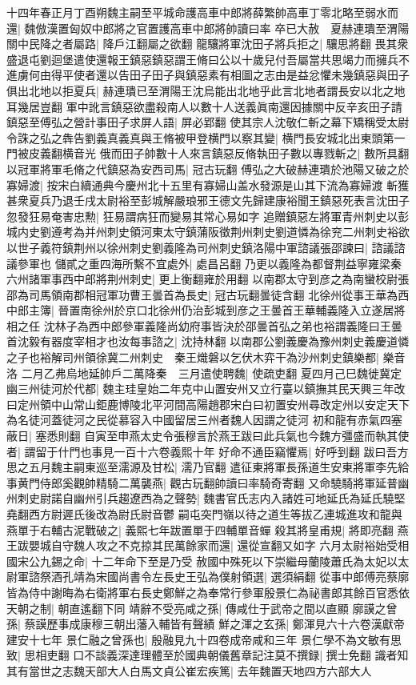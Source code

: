 十四年春正月丁酉朔魏主嗣至平城命護高車中郎將薛繁帥高車丁零北略至弱水而還|{
	魏倣漢置匈奴中郎將之官置護高車中郎將帥讀曰率}
卒已大赦　夏赫連璝至渭陽關中民降之者屬路|{
	降戶江翻屬之欲翻}
龍驤將軍沈田子將兵拒之|{
	驤思將翻}
畏其衆盛退屯劉迴堡遣使還報王鎮惡鎮惡謂王脩曰公以十歲兒付吾屬當共思竭力而擁兵不進虜何由得平使者還以告田子田子與鎮惡素有相圖之志由是益忿懼未幾鎮惡與田子俱出北地以拒夏兵|{
	赫連璝已至渭陽王沈烏能出北地乎此言北地者謂長安以北之地耳幾居豈翻}
軍中訛言鎮惡欲盡殺南人以數十人送義眞南還因據關中反辛亥田子請鎮惡至傅弘之營計事田子求屏人語|{
	屏必郢翻}
使其宗人沈敬仁斬之幕下矯稱受太尉令誅之弘之犇告劉義真義真與王脩被甲登横門以察其變|{
	横門長安城北出東頭第一門被皮義翻横音光}
俄而田子帥數十人來言鎮惡反脩執田子數以專戮斬之|{
	數所具翻}
以冠軍將軍毛脩之代鎮惡為安西司馬|{
	冠古玩翻}
傅弘之大破赫連璝於池陽又破之於寡婦渡|{
	按宋白續通典今慶州北十五里有寡婦山盖水發源是山其下流為寡婦渡}
斬獲甚衆夏兵乃退壬戌太尉裕至彭城解嚴琅邪王德文先歸建康裕聞王鎮惡死表言沈田子忽發狂易奄害忠勲|{
	狂易謂病狂而變易其常心易如字}
追贈鎮惡左將軍青州刺史以彭城内史劉遵考為并州刺史領河東太守鎮蒲阪徵荆州刺史劉道憐為徐兖二州刺史裕欲以世子義符鎮荆州以徐州刺史劉義隆為司州刺史鎮洛陽中軍諮議張邵諫曰|{
	諮議諮議參軍也}
儲貳之重四海所繫不宜處外|{
	處昌呂翻}
乃更以義隆為都督荆益寧雍梁秦六州諸軍事西中郎將荆州刺史|{
	更上衡翻雍於用翻}
以南郡太守到彦之為南蠻校尉張邵為司馬領南郡相冠軍功曹王曇首為長史|{
	冠古玩翻曇徒含翻}
北徐州從事王華為西中郎主簿|{
	晉置南徐州於京口北徐州仍治彭城到彦之王曇首王華輔義隆入立遂居將相之任}
沈林子為西中郎參軍義隆尚幼府事皆決於邵曇首弘之弟也裕謂義隆曰王曇首沈毅有器度宰相才也汝每事諮之|{
	沈持林翻}
以南郡公劉義慶為豫州刺史義慶道憐之子也裕解司州領徐冀二州刺史　秦王熾磐以乞伏木弈干為沙州刺史鎮樂都|{
	樂音洛}
二月乙弗烏地延帥戶二萬降秦　三月遣使聘魏|{
	使疏吏翻}
夏四月己巳魏徙冀定幽三州徒河於代都|{
	魏主珪皇始二年克中山置安州又立行臺以鎮撫其民天興三年改曰定州領中山常山鉅鹿博陵北平河間高陽趙郡宋白曰初置安州尋改定州以安定天下為名徒河蓋徒河之民從慕容入中國留居三州者魏人因謂之徒河}
初和龍有赤氣四塞蔽日|{
	塞悉則翻}
自寅至申燕太史令張穆言於燕王跋曰此兵氣也今魏方彊盛而執其使者|{
	謂留于什門也事見一百十六卷義熙十年}
好命不通臣竊懼焉|{
	好呼到翻}
跋曰吾方思之五月魏主嗣東巡至濡源及甘松|{
	濡乃官翻}
遣征東將軍長孫道生安東將軍李先給事黄門侍郎奚觀帥精騎二萬襲燕|{
	觀古玩翻帥讀曰率騎奇寄翻}
又命驍騎將軍延普幽州刺史尉諾自幽州引兵趨遼西為之聲勢|{
	魏書官氏志内入諸姓可地延氏為延氏驍堅堯翻西方尉遲氏後改為尉氏尉音鬱}
嗣屯突門嶺以待之道生等拔乙連城進攻和龍與燕單于右輔古泥戰破之|{
	義熙七年跋置單于四輔單音蟬}
殺其將皇甫規|{
	將即亮翻}
燕王跋嬰城自守魏人攻之不克掠其民萬餘家而還|{
	還從宣翻又如字}
六月太尉裕始受相國宋公九錫之命|{
	十二年命下至是乃受}
赦國中殊死以下崇繼母蘭陵蕭氏為太妃以太尉軍諮祭酒孔靖為宋國尚書令左長史王弘為僕射領選|{
	選須絹翻}
從事中郎傅亮蔡廓皆為侍中謝晦為右衛將軍右長史鄭鮮之為奉常行參軍殷景仁為祕書郎其餘百官悉依天朝之制|{
	朝直遙翻下同}
靖辭不受亮咸之孫|{
	傳咸仕于武帝之間以直顯}
廓謨之曾孫|{
	蔡謨歷事成康穆三朝出藩入輔皆有聲績}
鮮之渾之玄孫|{
	鄭渾見六十六卷漢獻帝建安十七年}
景仁融之曾孫也|{
	殷融見九十四卷成帝咸和三年}
景仁學不為文敏有思致|{
	思相吏翻}
口不談義深達理體至於國典朝儀舊章記注莫不撰録|{
	撰士免翻}
識者知其有當世之志魏天部大人白馬文貞公崔宏疾篤|{
	去年魏置天地四方六部大人}



